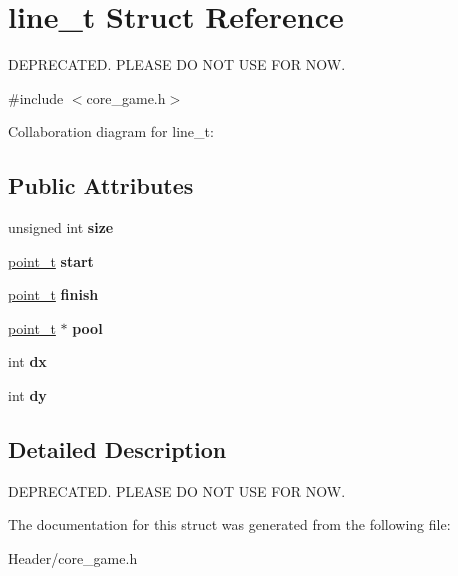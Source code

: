\hypertarget{structline__t}{}\section{line\+\_\+t Struct Reference}
\label{structline__t}


D\+E\+P\+R\+E\+C\+A\+T\+ED. P\+L\+E\+A\+SE DO N\+OT U\+SE F\+OR N\+OW.  




{\ttfamily \#include $<$core\+\_\+game.\+h$>$}



Collaboration diagram for line\+\_\+t\+:
\subsection*{Public Attributes}
\begin{DoxyCompactItemize}
\item 
\mbox{\label{structline__t_a67e75b1a848db944b25ab04f9de43f67}} 
unsigned int {\bfseries size}
\item 
\mbox{\label{structline__t_a7d483295b5a3bc67779c36f60caf2976}} 
\hyperlink{structpoint__t}{point\+\_\+t} {\bfseries start}
\item 
\mbox{\label{structline__t_a52f8a25a4d616cb5c011b819518ae5dd}} 
\hyperlink{structpoint__t}{point\+\_\+t} {\bfseries finish}
\item 
\mbox{\label{structline__t_a19f09c4f92595f3ad6a686789052dcf7}} 
\hyperlink{structpoint__t}{point\+\_\+t} $\ast$ {\bfseries pool}
\item 
\mbox{\label{structline__t_a9c18ecc84e4849b4d2ec85a52fffb8a3}} 
int {\bfseries dx}
\item 
\mbox{\label{structline__t_a0cb9dae2ceb48738f7862870dbbf7a3b}} 
int {\bfseries dy}
\end{DoxyCompactItemize}


\subsection{Detailed Description}
D\+E\+P\+R\+E\+C\+A\+T\+ED. P\+L\+E\+A\+SE DO N\+OT U\+SE F\+OR N\+OW. 

The documentation for this struct was generated from the following file\+:\begin{DoxyCompactItemize}
\item 
Header/core\+\_\+game.\+h\end{DoxyCompactItemize}

